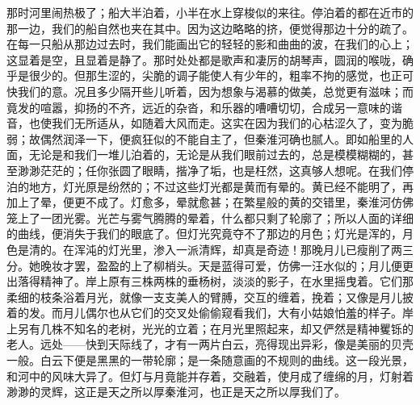 \documentclass[12pt,UTF-8,openany]{ctexbook}
\begin{document}
\begin{large}
    那时河里闹热极了；船大半泊着，小半在水上穿梭似的来往。停泊着的都在近市的那一边，我们的船自然也夹在其中。因为这边略略的挤，便觉得那边十分的疏了。在每一只船从那边过去时，我们能画出它的轻轻的影和曲曲的波，在我们的心上；这显着是空，且显着是静了。那时处处都是歌声和凄厉的胡琴声，圆润的喉咙，确乎是很少的。但那生涩的，尖脆的调子能使人有少年的，粗率不拘的感觉，也正可快我们的意。况且多少隔开些儿听着，因为想象与渴慕的做美，总觉更有滋味；而竟发的喧嚣，抑扬的不齐，远近的杂沓，和乐器的嘈嘈切切，合成另一意味的谐音，也使我们无所适从，如随着大风而走。这实在因为我们的心枯涩久了，变为脆弱；故偶然润泽一下，便疯狂似的不能自主了，但秦淮河确也腻人。即如船里的人面，无论是和我们一堆儿泊着的，无论是从我们眼前过去的，总是模模糊糊的，甚至渺渺茫茫的；任你张圆了眼睛，揩净了垢，也是枉然，这真够人想呢。在我们停泊的地方，灯光原是纷然的；不过这些灯光都是黄而有晕的。黄已经不能明了，再加上了晕，便更不成了。灯愈多，晕就愈甚；在繁星般的黄的交错里，秦淮河仿佛笼上了一团光雾。光芒与雾气腾腾的晕着，什么都只剩了轮廓了；所以人面的详细的曲线，便消失于我们的眼底了。但灯光究竟夺不了那边的月色；灯光是浑的，月色是清的。在浑沌的灯光里，渗入一派清辉，却真是奇迹！那晚月儿已瘦削了两三分。她晚妆才罢，盈盈的上了柳梢头。天是蓝得可爱，仿佛一汪水似的；月儿便更出落得精神了。岸上原有三株两株的垂杨树，淡淡的影子，在水里摇曳着。它们那柔细的枝条浴着月光，就像一支支美人的臂膊，交互的缠着，挽着；又像是月儿披着的发。而月儿偶尔也从它们的交叉处偷偷窥看我们，大有小姑娘怕羞的样子。岸上另有几株不知名的老树，光光的立着；在月光里照起来，却又俨然是精神矍铄的老人。远处——快到天际线了，才有一两片白云，亮得现出异彩，像是美丽的贝壳一般。白云下便是黑黑的一带轮廓；是一条随意画的不规则的曲线。这一段光景，和河中的风味大异了。但灯与月竟能并存着，交融着，使月成了缠绵的月，灯射着渺渺的灵辉，这正是天之所以厚秦淮河，也正是天之所以厚我们了。
    

\end{large}
\end{document}
